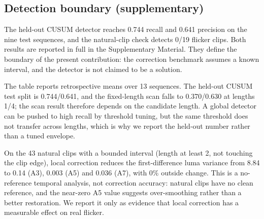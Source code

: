 \documentclass[twocolumn,10pt]{svjour3}
\begin{document}
\subsection{Detection boundary (supplementary)}

The held-out CUSUM detector reaches 0.744 recall and 0.641 precision on the nine test sequences, and the natural-clip check detects 0/19 flicker clips. Both results are reported in full in the Supplementary Material. They define the boundary of the present contribution: the correction benchmark assumes a known interval, and the detector is not claimed to be a solution.


\begin{table}[t]
\centering
\caption{Detection on all 13 sequences (frame-level mean; 12-frame intervals unless noted).}
\end{table}

The table reports retrospective means over 13 sequences. The held-out CUSUM test split is 0.744/0.641, and the fixed-length scan falls to 0.370/0.630 at lengths 1/4; the scan result therefore depends on the candidate length. A global detector can be pushed to high recall by threshold tuning, but the same threshold does not transfer across lengths, which is why we report the held-out number rather than a tuned envelope.


On the 43 natural clips with a bounded interval (length at least 2, not touching the clip edge), local correction reduces the first-difference luma variance from 8.84 to 0.14 (A3), 0.003 (A5) and 0.036 (A7), with 0\% outside change. This is a no-reference temporal analysis, not correction accuracy: natural clips have no clean reference, and the near-zero A5 value suggests over-smoothing rather than a better restoration. We report it only as evidence that local correction has a measurable effect on real flicker.
\end{document}
